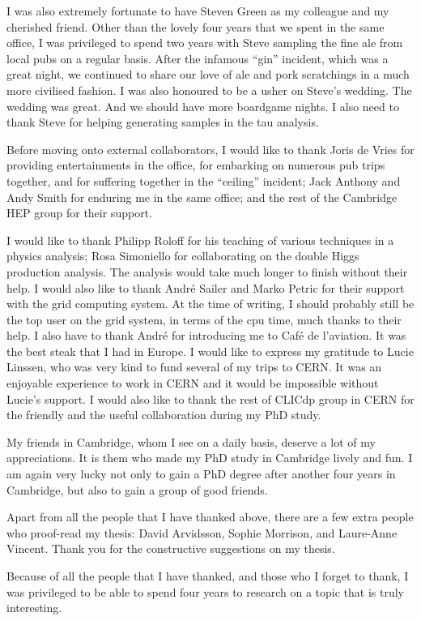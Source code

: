 \begin{acknowledgements}
I was also extremely fortunate to have Steven Green as my colleague and my cherished friend. Other than the lovely four years that we spent in the same office,   I was privileged to spend two years with Steve sampling the fine ale from local pubs on a regular basis. After the infamous ``gin'' incident, which was a great night, we continued to share our love of ale and pork scratchings in a much more civilised fashion. I was also honoured to be a usher on Steve's wedding. The wedding was great. And we should have more boardgame nights. I also need to thank Steve for helping generating samples in the tau analysis.


Before moving onto external collaborators, I would like to thank Joris de Vries for providing entertainments in the office, for embarking on numerous pub trips together, and for suffering together in the ``ceiling'' incident; Jack Anthony and Andy Smith for enduring me in the same office; and the rest of the Cambridge HEP group for their support.

I would like to thank Philipp Roloff for his teaching of various techniques in a physics analysis; Rosa Simoniello for collaborating on the double Higgs production analysis. The analysis would take much longer to finish without their help. I would also like to thank Andr\'{e} Sailer and Marko Petric for their support with the \CLIC grid computing system. At the time of writing, I should probably still be the top user on the grid system, in terms of the cpu time, much thanks to their help. I also have to thank Andr\'{e} for introducing me to Caf\'{e} de l'aviation. It was the best steak that I had in Europe. I would like to express my gratitude to Lucie Linssen, who was very kind to fund several of my trips to CERN. It was an enjoyable experience to work in CERN and it would be impossible without Lucie's support. I would also like to thank the rest of CLICdp group in CERN for the friendly and the useful collaboration during my PhD study.

My friends in Cambridge, whom I see on a daily basis, deserve a lot of my appreciations. It is them who made my PhD study in Cambridge lively and fun. I am again very lucky not only to gain a PhD degree  after another four years in Cambridge, but also to gain a group of good friends.

Apart from all the people that I have thanked above, there are a few extra people who proof-read my thesis: David Arvidsson, Sophie Morrison, and Laure-Anne Vincent. Thank you for the constructive suggestions on my thesis.

Because of all the people that I have thanked, and those who I forget to thank, I was privileged to be able to spend four years to research on a topic that is truly interesting.


\end{acknowledgements}


